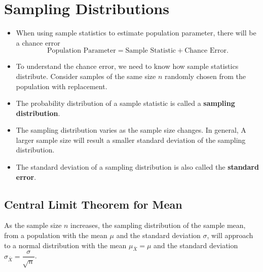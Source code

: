 
\hypertarget{sampling-distributions}{%
\section{Sampling Distributions}\label{sampling-distributions}}

\begin{itemize}
\item
  When using sample statistics to estimate population parameter, there
  will be a chance error
  \[\text{Population Parameter}=\text{Sample Statistic}+\text{Chance Error}.\]
\item
  To understand the chance error, we need to know how sample statistics
  distribute. Consider samples of the same size \(n\) randomly chosen
  from the population with replacement.
\item
  The probability distribution of a sample statistic is called a
  \textbf{sampling distribution}.
\item
  The sampling distribution varies as the sample size changes. In
  general, A larger sample size will result a smaller standard deviation
  of the sampling distribution.
\item
  The standard deviation of a sampling distribution is also called the
  \textbf{standard error}.
\end{itemize}

\hypertarget{central-limit-theorem-for-mean}{%
\subsection{Central Limit Theorem for
Mean}\label{central-limit-theorem-for-mean}}

\begin{theorem}
As the sample size \(n\) increases, the sampling distribution of the
sample mean, from a population with the mean \(\mu\) and the standard
deviation \(\sigma\), will approach to a normal distribution with the
mean \(\mu_{\bar{X}}=\mu\) and the standard deviation
\(\sigma_{\bar{X}}=\dfrac{\sigma}{\sqrt{n}}\).
\end{theorem}

